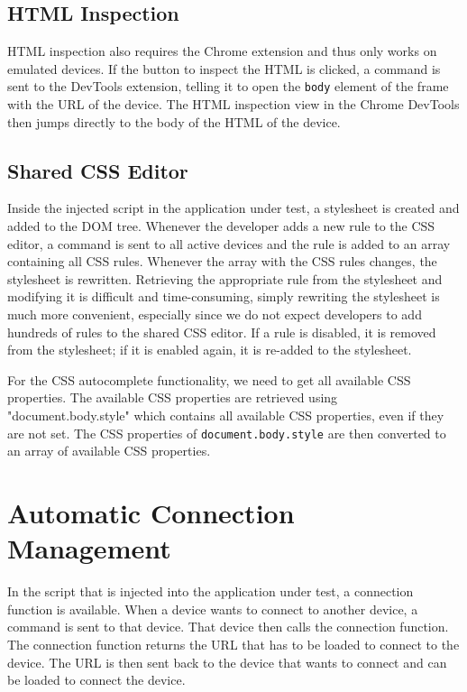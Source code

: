 \subsection{HTML Inspection}

HTML inspection also requires the Chrome extension and thus only works on emulated devices. If the button to inspect the HTML is clicked, a command is sent to the DevTools extension, telling it to open the \lstinline|body| element of the frame with the URL of the device. The HTML inspection view in the Chrome DevTools then jumps directly to the body of the HTML of the device.

\subsection{Shared CSS Editor}

Inside the injected script in the application under test, a stylesheet is created and added to the DOM tree. Whenever the developer adds a new rule to the CSS editor, a command is sent to all active devices and the rule is added to an array containing all CSS rules. Whenever the array with the CSS rules changes, the stylesheet is rewritten. Retrieving the appropriate rule from the stylesheet and modifying it is difficult and time-consuming, simply rewriting the stylesheet is much more convenient, especially since we do not expect developers to add hundreds of rules to the shared CSS editor. If a rule is disabled, it is removed from the stylesheet; if it is enabled again, it is re-added to the stylesheet.

For the CSS autocomplete functionality, we need to get all available CSS properties. The available CSS properties are retrieved using "document.body.style" which contains all available CSS properties, even if they are not set. The CSS properties of \lstinline|document.body.style| are then converted to an array of available CSS properties.

\section{Automatic Connection Management}

In the script that is injected into the application under test, a connection function is available. When a device wants to connect to another device, a command is sent to that device. That device then calls the connection function. The connection function returns the URL that has to be loaded to connect to the device. The URL is then sent back to the device that wants to connect and can be loaded to connect the device.

